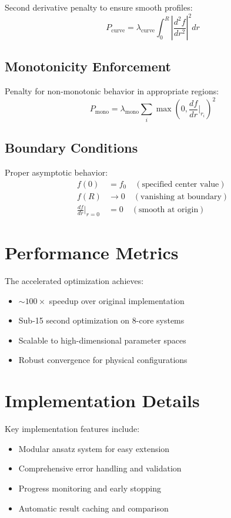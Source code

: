 \documentclass[12pt]{article}
\begin{document}
Second derivative penalty to ensure smooth profiles:
\[
P_{\text{curve}} = \lambda_{\text{curve}} \int_0^R \left|\frac{d^2 f}{dr^2}\right|^2 dr
\]

\subsection{Monotonicity Enforcement}

Penalty for non-monotonic behavior in appropriate regions:
\[
P_{\text{mono}} = \lambda_{\text{mono}} \sum_{i} \max\left(0, \frac{df}{dr}\bigg|_{r_i}\right)^2
\]

\subsection{Boundary Conditions}

Proper asymptotic behavior:
\begin{align}
f(0) &= f_0 \quad (\text{specified center value}) \\
f(R) &\to 0 \quad (\text{vanishing at boundary}) \\
\frac{df}{dr}\bigg|_{r=0} &= 0 \quad (\text{smooth at origin})
\end{align}

\section{Performance Metrics}

The accelerated optimization achieves:
\begin{itemize}
\item \(\sim 100\times\) speedup over original implementation
\item Sub-15 second optimization on 8-core systems
\item Scalable to high-dimensional parameter spaces
\item Robust convergence for physical configurations
\end{itemize}

\section{Implementation Details}

Key implementation features include:
\begin{itemize}
\item Modular ansatz system for easy extension
\item Comprehensive error handling and validation
\item Progress monitoring and early stopping
\item Automatic result caching and comparison
\end{itemize}
\end{document}
